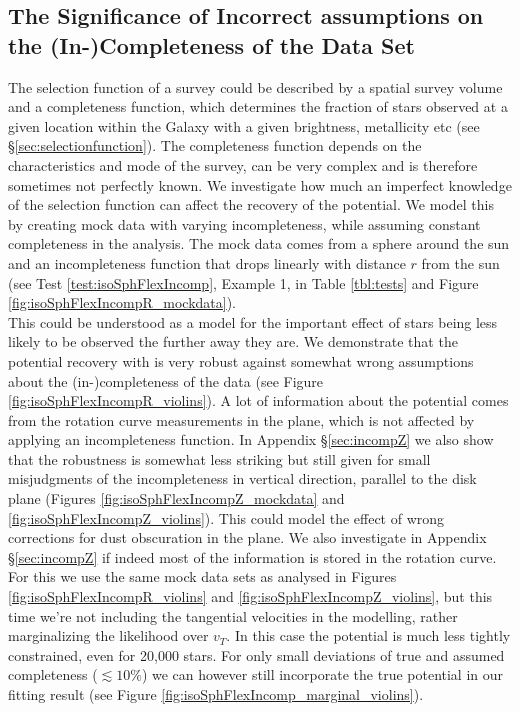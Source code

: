 \subsection{The Significance of Incorrect assumptions on the (In-)Completeness of the Data Set} \label{sec:results_incompR}

The selection function of a survey could be described by a spatial survey volume and a completeness function, which determines the fraction of stars observed at a given location within the Galaxy with a given brightness, metallicity etc (see \S\ref{sec:selectionfunction}). The completeness function depends on the characteristics and mode of the survey, can be very complex and is therefore sometimes not perfectly known. We investigate how much an imperfect knowledge of the selection function can affect the recovery of the potential. We model this by creating mock data with varying incompleteness, while assuming constant completeness in the analysis. The mock data comes from a sphere around the sun and an incompleteness function that drops linearly with distance $r$ from the sun (see Test \ref{test:isoSphFlexIncomp}, Example 1, in Table \ref{tbl:tests} and Figure \ref{fig:isoSphFlexIncompR_mockdata}).
\\This could be understood as a model for the important effect of stars being less likely to be observed the further away they are. We demonstrate that the potential recovery with \RM is very robust against somewhat wrong assumptions about the (in-)completeness of the data (see Figure \ref{fig:isoSphFlexIncompR_violins}). A lot of information about the potential comes from the rotation curve measurements in the plane, which is not affected by applying an incompleteness function. In Appendix \S\ref{sec:incompZ} we also show that the robustness is somewhat less striking but still given for small misjudgments of the incompleteness in vertical direction, parallel to the disk plane (Figures \ref{fig:isoSphFlexIncompZ_mockdata} and \ref{fig:isoSphFlexIncompZ_violins}). This could model the effect of wrong corrections for dust obscuration in the plane. We also investigate in Appendix \S\ref{sec:incompZ} if indeed most of the information is stored in the rotation curve. For this we use the same mock data sets as analysed in Figures \ref{fig:isoSphFlexIncompR_violins} and \ref{fig:isoSphFlexIncompZ_violins}, but this time we’re not including the tangential velocities in the modelling, rather marginalizing the likelihood over $v_T$. In this case the potential is much less tightly constrained, even for 20,000 stars. For only small deviations of true and assumed completeness ($\lesssim 10\%$) we can however still incorporate the true potential in our fitting result (see Figure \ref{fig:isoSphFlexIncomp_marginal_violins}). 



